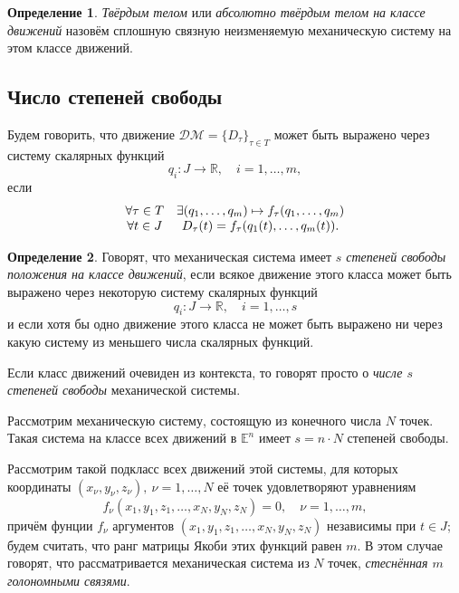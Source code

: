 \documentclass{article}
\theoremstyle{definition}
\newtheorem{definition}{Определение}[section]
\theoremstyle{plain}
\theoremstyle{remark}
\numberwithin{equation}{section}
\begin{document}
\begin{definition}
  \textit{Твёрдым телом} или \textit{абсолютно твёрдым телом на классе движений}
  назовём сплошную связную неизменяемую механическую систему на этом классе
  движений.
\end{definition}

\subsection{Число степеней свободы}

Будем говорить, что движение $\mathcal{DM} = \{ D_\tau \}_{\tau \in T}$ может
быть выражено через систему скалярных функций
\begin{equation*}
  q_i : J \to \mathbb{R}, \quad i = 1, \dots, m,
\end{equation*}
если
\begin{equation}
  \begin{array}{c c}
    \forall \tau \in T & \exists (q_1, \dots, q_m) \mapsto
      f_\tau(q_1, \dots, q_m) \\
    \forall t \in J & D_\tau(t) = f_\tau(q_1(t), \dots, q_m(t)).
  \end{array}
\end{equation}

\begin{definition}
  Говорят, что механическая система имеет \textit{$s$ степеней свободы положения
  на классе движений}, если всякое движение этого класса может быть выражено
  через некоторую систему скалярных функций
  \begin{equation*}
    q_i : J \to \mathbb{R}, \quad i = 1, \dots, s
  \end{equation*}
  и если хотя бы одно движение этого класса не может быть выражено ни через
  какую систему из меньшего числа скалярных функций.

  Если класс движений очевиден из контекста, то говорят просто о \textit{числе
  $s$ степеней свободы} механической системы.
\end{definition}

Рассмотрим механическую систему, состоящую из конечного числа $N$ точек. Такая
система на классе всех движений в $\mathbb{E}^n$ имеет $s = n \cdot N$ степеней
свободы.

Рассмотрим такой подкласс всех движений этой системы, для которых координаты
$(x_\nu, y_\nu, z_\nu),~\nu=1,\dots,N$ её точек удовлетворяют уравнениям
\begin{equation*}
  f_\nu(x_1, y_1, z_1, \dots, x_N, y_N, z_N) = 0, \quad \nu = 1,\dots,m,
\end{equation*}
причём фунции $f_\nu$ аргументов $(x_1,y_1,z_1, \dots, x_N,y_N,z_N)$ независимы
при $t \in J$; будем считать, что ранг матрицы Якоби этих функций равен $m$. В
этом случае говорят, что рассматривается механическая система из $N$ точек,
\textit{стеснённая $m$ голономными связями}.
\end{document}
